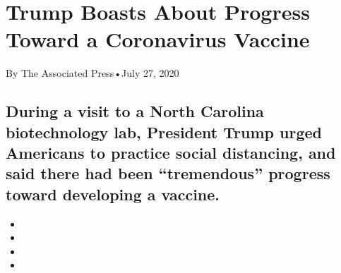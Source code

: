 \hypertarget{trump-boasts-about-progress-toward-a-coronavirus-vaccine-1}{%
\section{Trump Boasts About Progress Toward a Coronavirus
Vaccine}\label{trump-boasts-about-progress-toward-a-coronavirus-vaccine-1}}

By The Associated Press•July 27, 2020

\hypertarget{during-a-visit-to-a-north-carolina-biotechnology-lab-president-trump-urged-americans-to-practice-social-distancing-and-said-there-had-been-tremendous-progress-toward-developing-a-vaccine-1}{%
\subsection{During a visit to a North Carolina biotechnology lab,
President Trump urged Americans to practice social distancing, and said
there had been ``tremendous'' progress toward developing a
vaccine.}\label{during-a-visit-to-a-north-carolina-biotechnology-lab-president-trump-urged-americans-to-practice-social-distancing-and-said-there-had-been-tremendous-progress-toward-developing-a-vaccine-1}}

\begin{itemize}
\item
\item
\item
\item
\end{itemize}

